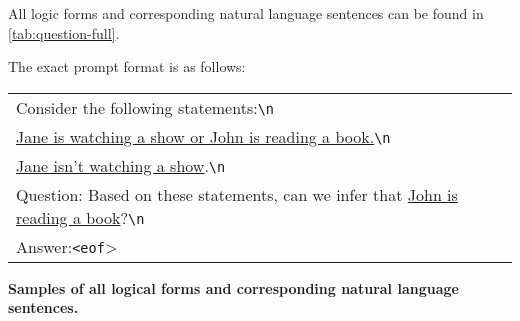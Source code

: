 All logic forms and corresponding natural language sentences can be found in \cref{tab:question-full}.

The exact prompt format is as follows:

\begin{table}[H]
    \small
    \begin{tabular}{p{\linewidth}}
    Consider the following statements:\verb|\n|\\
    \uline{Jane is watching a show or John is reading a book.}\verb|\n|\\
    \uline{Jane isn't watching a show}.\verb|\n|\\
    Question: Based on these statements, can we infer that \uline{John is reading a book}?\verb|\n|\\
    Answer:\verb|<eof|>
    \end{tabular}
\end{table}
\vspace{-1em}

\newcommand{\subjectA}{\uline{Jane}}
\newcommand{\vpA}{\uline{watching a show}} 
\newcommand{\subjectB}{\uline{John}}
\newcommand{\vpB}{\uline{reading a book}}

\begin{table*}
\scriptsize

\caption{\textbf{Samples of all logical forms and corresponding natural language sentences.}}
\label{tab:question-full}
\end{table*}
